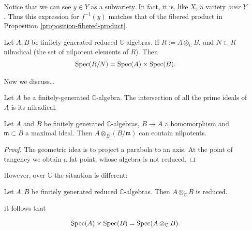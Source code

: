 \begin{remark}
\label{remark-preimage-as-fibered-product}
Notice that we can see $y \in Y$ as a
subvariety.
In fact, it is, like $X$, a variety {\it over
$Y$}.
Thus this expression for $f^{-1}(y)$
matches that of the fibered product
in Proposition
\ref{proposition-fibered-product}.
\end{remark}

\begin{lemma}
\label{lemma-produ-affin-varie-tenso-algeb}
Let $A,B$ be finitely generated reduced
$\mathbb{C}$-algebras.
If $R:=A \otimes_{\mathbb{C}}B$, and $N
\subset R$
nilradical (the set of nilpotent elements of
$R$).
Then
$$
\mathop{\mathrm{Spec}}(R/N) = \mathop{\mathrm{Spec}}(A) \times \mathop{\mathrm{Spec}}(B).
$$

\end{lemma}

\medskip\noindent
Now we discuss…

\begin{lemma}
\label{lemma-inter-maxim-ideal-nilra}
Let $A$ be a finitely-generated
$\mathbb{C}$-algebra.
The intersection of all the prime ideals of
$A$
is its nilradical.
\end{lemma}

\begin{exercise}
\label{exercise-tenso-produ-may-conta-nilp}
Let $A$ and $B$ be finitely generated
$\mathbb{C}$-algebras,
$B \to A$ a homomorphism and $\mathfrak{m}
\subset B$ a maximal ideal.
Then $A\otimes_B (B/\mathfrak{m})$ can
contain nilpotents.
\end{exercise}

\begin{proof}
The geometric idea is to project a parabola
to an axis.
At the point of tangency we obtain a fat
point,
whose algebra is not reduced.
\end{proof}

However, over $\mathbb{C}$ the situation is
different:

\begin{theorem}
\label{theorem-tenso-produ-over-c-reduc}
Let $A,B$ be finitely generated reduced
$\mathbb{C}$-algebras.
Then $A \otimes_\mathbb{C} B$ is reduced.
\end{theorem}

It follows that

\begin{theorem}
\label{theorem-tenso-produ-affin-varie}
$$
\mathop{\mathrm{Spec}}(A)\times \mathop{\mathrm{Spec}}(B) = \mathop{\mathrm{Spec}}(A
\otimes_\mathbb{C}B).
$$
\end{theorem}

